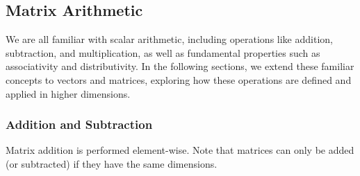 \documentclass[../readings.tex]{subfiles}
\begin{document}

\subsection{Matrix Arithmetic}

We are all familiar with scalar arithmetic, including operations like addition, subtraction, and multiplication, as well as fundamental properties such as associativity and distributivity. In the following sections, we extend these familiar concepts to vectors and matrices, exploring how these operations are defined and applied in higher dimensions.

\subsubsection{Addition and Subtraction}

Matrix addition is performed element-wise. Note that matrices can only be added (or subtracted) if they have the same dimensions.


\end{document}
